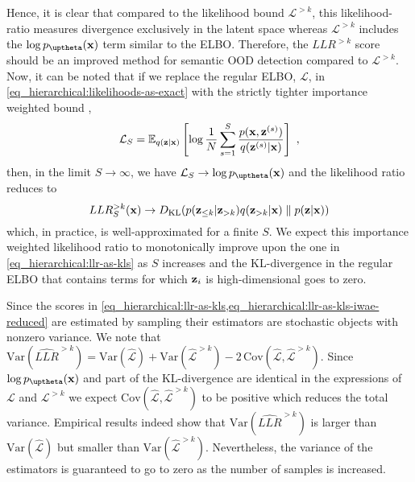 {Hence, it is clear that compared to the likelihood bound $\mathcal{L}^{>k}$, this likelihood-ratio measures divergence exclusively in the latent space whereas $\mathcal{L}^{>k}$ includes the $\log p_\thetab(\xb)$ term similar to the ELBO.
Therefore, the $LLR^{>k}$ score should be an improved method for semantic OOD detection compared to $\mathcal{L}^{>k}$.
Now, it can be noted that if we replace the regular ELBO, $\mathcal{L}$, in \cref{eq_hierarchical:likelihoods-as-exact} with the strictly tighter importance weighted bound \parencite{burda_importance_2016},
\begin{equation}
    \mathcal{L}_{S} = \mathbb{E}_{q(\zb|\xb)}\left[ \log \frac{1}{N} \sum_{s=1}^{S} \frac{p(\xb, \zb^{(s)})}{q(\zb^{(s)}|\xb)} \right] \ , \label{eq_hierarchical:iw-bound}
\end{equation}
then, in the limit $S\rightarrow\infty$, we have $\mathcal{L}_{S} \rightarrow \log p_\thetab(\xb)$ and the likelihood ratio reduces to
\begin{equation}
    LLR^{>k}_{S}({\mathbf{x}}) \rightarrow D_{\mathrm{KL}}( p({\mathbf{z}}_{\leq k}|{\mathbf{z}}_{>k}) q({\mathbf{z}}_{>k}|{\mathbf{x}}) \parallel p({\mathbf{z}}|{\mathbf{x}}))
\end{equation}\label{eq_hierarchical:llr-as-kls-iwae-reduced}
which, in practice, is well-approximated for a finite $S$. We expect this importance weighted likelihood ratio to monotonically improve upon the one in \cref{eq_hierarchical:llr-as-kls} as $S$ increases and the KL-divergence in the regular ELBO that contains terms for which ${\mathbf{z}}_i$ is high-dimensional goes to zero.


Since the scores in \cref{eq_hierarchical:llr-as-kls,eq_hierarchical:llr-as-kls-iwae-reduced} are estimated by sampling their estimators are stochastic objects with nonzero variance.
We note that $\text{Var}(\widehat{LLR}^{>k}) = \text{Var}(\hat{\mathcal{L}}) + \text{Var}(\hat{\mathcal{L}}^{>k}) - 2\, \text{Cov}(\hat{\mathcal{L}}, \hat{\mathcal{L}}^{>k})$.
Since $\log p_\thetab(\xb)$ and part of the KL-divergence are identical in the expressions of $\mathcal{L}$ and $\mathcal{L}^{>k}$ we expect $\text{Cov}(\hat{\mathcal{L}}, \hat{\mathcal{L}}^{>k})$ to be positive which reduces the total variance. 
Empirical results indeed show that $\text{Var}(\widehat{LLR}^{>k})$ is larger than $\text{Var}(\hat{\mathcal{L}})$ but smaller than $\text{Var}(\hat{\mathcal{L}}^{>k})$.
Nevertheless, the variance of the estimators is guaranteed to go to zero as the number of samples is increased.

}

